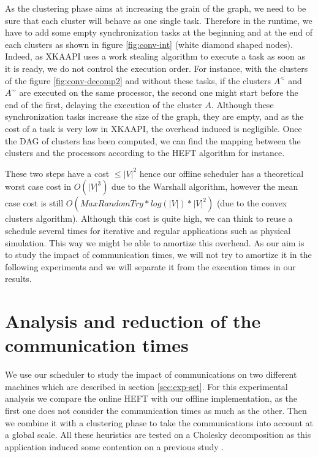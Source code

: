 \documentclass[10pt, conference, compsocconf,pdftex,dvipsnames]{IEEEtran}
\begin{document}
As the clustering phase aims at increasing the grain of the graph, we need to
be sure that each cluster will behave as one single task. Therefore in the
runtime, we have to add some empty synchronization tasks at the beginning and
at the end of each clusters as shown in figure \ref{fig:conv-int} (white
diamond shaped nodes).  Indeed, as XKAAPI uses a work stealing algorithm to
execute a task as soon as it is ready, we do not control the execution order.
For instance, with the clusters of the figure \ref{fig:conv-decomp2} and
without these tasks, if the clusters $A^<$ and $A^{\sim}$ are executed on the
same processor, the second one might start before the end of the first,
delaying the execution of the cluster $A$. Although these synchronization
tasks increase the size of the graph, they are empty, and as the cost of a
task is very low in XKAAPI, the overhead induced is negligible. Once the DAG
of clusters has been computed, we can find the mapping between the clusters
and the processors according to the HEFT algorithm for instance. 

These two steps have a cost $\leq |V|^2$ hence our offline scheduler has a
theoretical worst case cost in $O(|V|^3)$ due to the Warshall algorithm,
however the mean case cost is still $O(MaxRandomTry*log(|V|)*|V|^2)$ (due to
the convex clusters algorithm).  Although this cost is quite high, we can
think to reuse a schedule several times for iterative and regular
applications such as physical simulation.  This way we might be able to
amortize this overhead. As our aim is to study the impact of communication
times, we will not try to amortize it in the following experiments and we will
separate it from the execution times in our results.

\section{Analysis and reduction of the communication times}
\label{sec:exp}

We use our scheduler to study the impact of communications on two different
machines which are described in section \ref{sec:exp-set}. For this
experimental analysis we compare the online HEFT with our offline implementation,
as the first one does not consider the communication times as much as the
other. Then we combine it with a clustering phase to take the communications
into account at a global scale. All these heuristics are tested on a
Cholesky decomposition as this application induced some contention on a
previous study \cite{ferreiralima:hal-00735470}.
\end{document}

